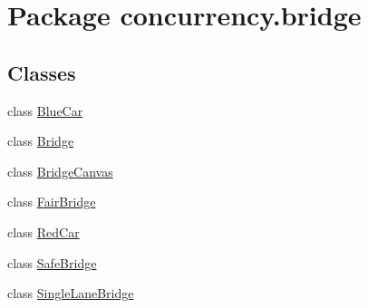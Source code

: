\hypertarget{namespaceconcurrency_1_1bridge}{}\section{Package concurrency.\+bridge}
\label{namespaceconcurrency_1_1bridge}
\subsection*{Classes}
\begin{DoxyCompactItemize}
\item 
class \mbox{\hyperlink{classconcurrency_1_1bridge_1_1_blue_car}{Blue\+Car}}
\item 
class \mbox{\hyperlink{classconcurrency_1_1bridge_1_1_bridge}{Bridge}}
\item 
class \mbox{\hyperlink{classconcurrency_1_1bridge_1_1_bridge_canvas}{Bridge\+Canvas}}
\item 
class \mbox{\hyperlink{classconcurrency_1_1bridge_1_1_fair_bridge}{Fair\+Bridge}}
\item 
class \mbox{\hyperlink{classconcurrency_1_1bridge_1_1_red_car}{Red\+Car}}
\item 
class \mbox{\hyperlink{classconcurrency_1_1bridge_1_1_safe_bridge}{Safe\+Bridge}}
\item 
class \mbox{\hyperlink{classconcurrency_1_1bridge_1_1_single_lane_bridge}{Single\+Lane\+Bridge}}
\end{DoxyCompactItemize}
